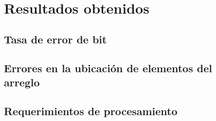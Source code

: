 \chapter{Resultados obtenidos}\label{ch:resultados}

\section{Tasa de error de bit}\label{subc:resul_bertest}

\section{Errores en la ubicación de elementos del arreglo}\label{subc:resul_elem}

\section{Requerimientos de procesamiento}\label{subc:resul_proc}
